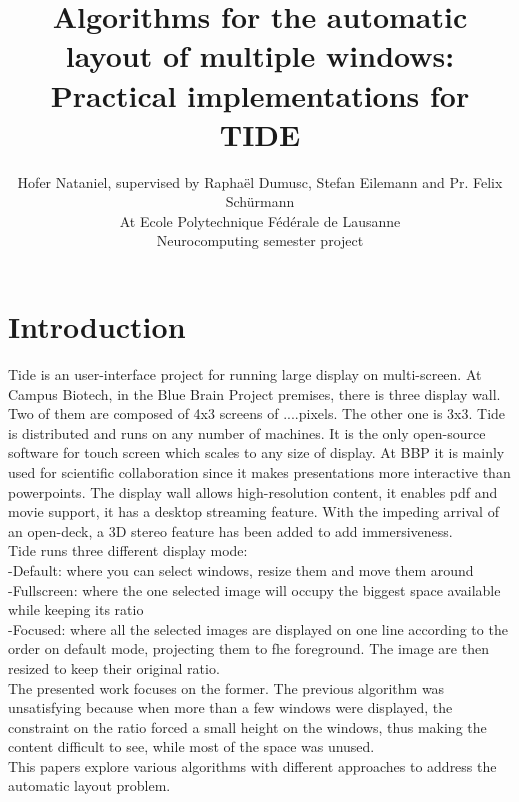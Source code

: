 \documentclass{acmtog}
\begin{document}
\makeatletter
\def\runningfoot{\def\@runningfoot{}}
\def\firstfoot{\def\@firstfoot{}}
\makeatother



\title{Algorithms for the automatic layout of multiple windows: \\Practical implementations for TIDE}

\author{Hofer Nataniel, supervised by Raphaël Dumusc, Stefan Eilemann and Pr. Felix Schürmann \\
At Ecole Polytechnique Fédérale de Lausanne\\
Neurocomputing semester project}

\maketitle

\section{Introduction}
Tide is an user-interface project for running large display on multi-screen. At Campus Biotech, in the Blue Brain Project premises, there is three display wall. Two of them are composed of 4x3 screens of ....pixels. The other one is 3x3. Tide is distributed and runs on any number of machines. It is the only open-source software for touch screen which scales to any size of display. At BBP it is mainly used for scientific collaboration since it makes presentations more interactive than powerpoints. The display wall allows  high-resolution content, it enables pdf and movie support, it has a desktop streaming feature. With the impeding arrival of an open-deck, 
a 3D stereo feature has been added to add immersiveness. \\
Tide runs three different display mode:\\
-Default: where you can select windows, resize them and move them around \\
-Fullscreen: where the one selected image will occupy the biggest space available while keeping its ratio \\
-Focused: where  all the selected images are displayed on one line according to the order on default mode, projecting them to fhe foreground. The image are then resized to keep their original ratio.\\
The presented work focuses on the former. 
The previous algorithm was unsatisfying because when more than a few windows were displayed, the constraint on the ratio forced a small height on the windows, thus making the content difficult to see, while most of the space was unused. \\
This papers explore various algorithms with different approaches to address the automatic layout problem.\\
\end{document}
